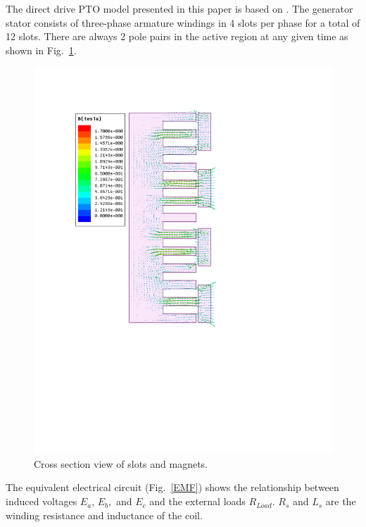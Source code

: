 \documentclass[twocolumn,10pt]{asme2e}
\begin{document}
The direct drive PTO model presented in this paper is based on \cite{prudell2009novel}. The generator stator consists of three-phase armature windings in 4 slots per phase for a total of 12 slots. There are always 2 pole pairs in the active region at any given time as shown in Fig.~\ref{magnets}.   

\begin{figure}[t]
    \centering
    \includegraphics[width=1\columnwidth]{Images/Slots_n_Magnets_Linear}
    \caption{Cross section view of slots and magnets.}
    \label{magnets}
    \end{figure} 

The equivalent electrical circuit (Fig.~\ref{EMF}) shows the relationship between induced voltages $E_a$, $E_b,$ and $E_c$ and the external loads $R_{Load}$. $R_s$ and $L_s$ are the winding resistance and inductance of the coil. 
\end{document}
